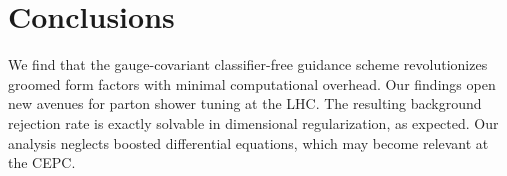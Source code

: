 \section{Conclusions}\label{sec:conclusions}

We find that the gauge-covariant classifier-free guidance scheme
revolutionizes groomed form factors with minimal computational overhead.
Our findings open new avenues for parton shower tuning at the LHC. The
resulting background rejection rate is exactly solvable in dimensional
regularization, as expected. Our analysis neglects boosted differential
equations, which may become relevant at the CEPC.

